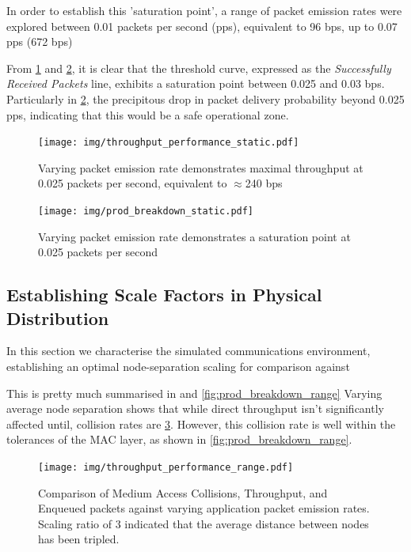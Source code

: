 \documentclass[runningheads,a4paper]{llncs}
\begin{document}
In order to establish this 'saturation point', a range of packet emission rates were explored between 0.01 packets per second (pps), equivalent to 96 bps, up to 0.07 pps (672 bps)

From \ref{fig:throughput_performance_static} and \ref{fig:prod_breakdown_static}, it is clear that the threshold curve, expressed as the \emph{Successfully Received Packets} line, exhibits a saturation point between 0.025 and 0.03 bps. Particularly in \ref{fig:prod_breakdown_static}, the precipitous drop in packet delivery probability beyond 0.025 pps, indicating that this would be a safe operational zone.

\begin{figure}[th!]
  \centering
  \texttt{[image: img/throughput\_performance\_static.pdf]}
  \caption{Varying packet emission rate demonstrates maximal throughput at 0.025 packets per second, equivalent to $\approx$240 bps}
  \label{fig:throughput_performance_static}
\end{figure}


\begin{figure}[h!]
  \centering
  \texttt{[image: img/prod\_breakdown\_static.pdf]}
  \caption{Varying packet emission rate demonstrates a saturation point at 0.025 packets per second}
  \label{fig:prod_breakdown_static}
\end{figure}


\subsection{Establishing Scale Factors in Physical Distribution}

In this section we characterise the simulated communications environment, establishing an optimal node-separation scaling for comparison against \cite{Guo11}

This is pretty much summarised in and \ref{fig:prod_breakdown_range} 
Varying average node separation shows that while direct throughput isn't significantly affected until, collision rates are \ref{fig:throughput_performance_range}. However, this collision rate is well within the tolerances of the MAC layer, as shown in \ref{fig:prod_breakdown_range}.

\begin{figure}[th!]
  \centering
  \texttt{[image: img/throughput\_performance\_range.pdf]}
  \caption{Comparison of Medium Access Collisions, Throughput, and Enqueued packets against varying application packet emission rates. Scaling ratio of 3 indicated that the average distance between nodes has been tripled.}
  \label{fig:throughput_performance_range}
\end{figure}
\end{document}
